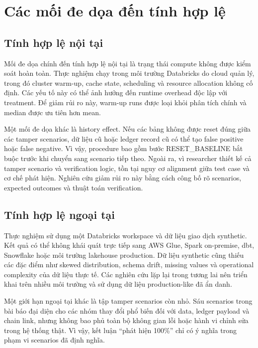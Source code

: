 \section{Các mối đe dọa đến tính hợp lệ}

\subsection{Tính hợp lệ nội tại}

Mối đe dọa chính đến tính hợp lệ nội tại là trạng thái compute không được kiểm soát hoàn toàn. Thực nghiệm chạy trong môi trường Databricks do cloud quản lý, trong đó cluster warm-up, cache state, scheduling và resource allocation không cố định. Các yếu tố này có thể ảnh hưởng đến runtime overhead độc lập với treatment. Để giảm rủi ro này, warm-up runs được loại khỏi phân tích chính và median được ưu tiên hơn mean.

Một mối đe dọa khác là history effect. Nếu các bảng không được reset đúng giữa các tamper scenarios, dữ liệu cũ hoặc ledger record cũ có thể tạo false positive hoặc false negative. Vì vậy, procedure bao gồm bước RESET\_BASELINE bắt buộc trước khi chuyển sang scenario tiếp theo. Ngoài ra, vì researcher thiết kế cả tamper scenario và verification logic, tồn tại nguy cơ alignment giữa test case và cơ chế phát hiện. Nghiên cứu giảm rủi ro này bằng cách công bố rõ scenarios, expected outcomes và thuật toán verification.

\subsection{Tính hợp lệ ngoại tại}

Thực nghiệm sử dụng một Databricks workspace và dữ liệu giao dịch synthetic. Kết quả có thể không khái quát trực tiếp sang AWS Glue, Spark on-premise, dbt, Snowflake hoặc môi trường lakehouse production. Dữ liệu synthetic cũng thiếu các đặc điểm như skewed distribution, schema drift, missing values và operational complexity của dữ liệu thực tế. Các nghiên cứu lặp lại trong tương lai nên triển khai trên nhiều môi trường và sử dụng dữ liệu production-like đã ẩn danh.

Một giới hạn ngoại tại khác là tập tamper scenarios còn nhỏ. Sáu scenarios trong bài báo đại diện cho các nhóm thay đổi phổ biến đối với data, ledger payload và chain link, nhưng không bao phủ toàn bộ không gian lỗi hoặc hành vi chỉnh sửa trong hệ thống thật. Vì vậy, kết luận ``phát hiện 100\%'' chỉ có ý nghĩa trong phạm vi scenarios đã định nghĩa.


